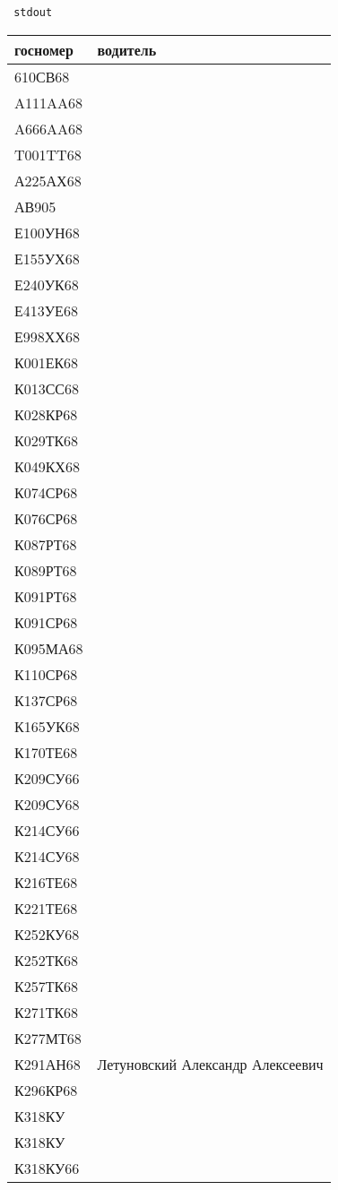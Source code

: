 \documentclass[a4paper,12pt]{article}
\begin{document}
\texttt{ stdout } 

\begin{longtable}{ ll }
\toprule
госномер & водитель \\ 
\midrule
610СВ68 &  \\ 
A111AA68 &  \\ 
A666AA68 &  \\ 
T001TT68 &  \\ 
А225АХ68 &  \\ 
АВ905 &  \\ 
Е100УН68 &  \\ 
Е155УХ68 &  \\ 
Е240УК68 &  \\ 
Е413УЕ68 &  \\ 
Е998ХХ68 &  \\ 
К001ЕК68 &  \\ 
К013СС68 &  \\ 
К028КР68 &  \\ 
К029ТК68 &  \\ 
К049КХ68 &  \\ 
К074СР68 &  \\ 
К076СР68 &  \\ 
К087РТ68 &  \\ 
К089РТ68 &  \\ 
К091РТ68 &  \\ 
К091СР68 &  \\ 
К095МА68 &  \\ 
К110СР68 &  \\ 
К137СР68 &  \\ 
К165УК68 &  \\ 
К170ТЕ68 &  \\ 
К209СУ66 &  \\ 
К209СУ68 &  \\ 
К214СУ66 &  \\ 
К214СУ68 &  \\ 
К216ТЕ68 &  \\ 
К221ТЕ68 &  \\ 
К252КУ68 &  \\ 
К252ТК68 &  \\ 
К257ТК68 &  \\ 
К271ТК68 &  \\ 
К277МТ68 &  \\ 
К291АН68 & Летуновский Александр Алексеевич \\ 
К296КР68 &  \\ 
К318КУ &  \\ 
К318КУ &  \\ 
К318КУ66 &  \\ 

\end{longtable}
\end{document}
